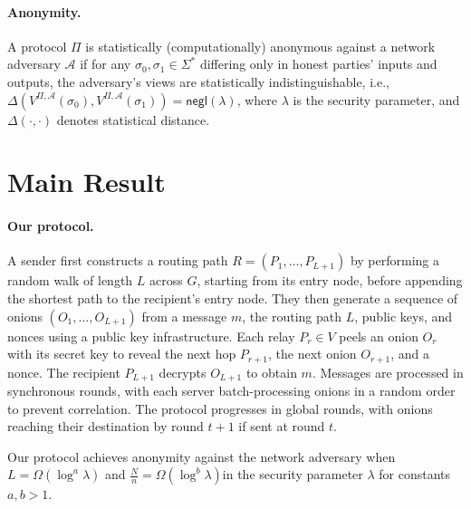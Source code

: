 \paragraph{Anonymity.} A protocol $\Pi$ is statistically (computationally) anonymous against a network adversary $\mathcal{A}$ if for any $\sigma_0, \sigma_1 \in \Sigma^*$ differing only in honest parties' inputs and outputs, the adversary’s views are statistically indistinguishable, i.e., $\Delta(V^{\Pi,\mathcal{A}}(\sigma_0), V^{\Pi,\mathcal{A}}(\sigma_1)) = \mathsf{negl}(\lambda)$, where $\lambda$ is the security parameter, and $\Delta(\cdot, \cdot)$ denotes statistical distance. 



\section{Main Result}

\paragraph{Our protocol.} A sender first constructs a routing path $R =(P_1, \dots, P_{L+1})$ by performing a random walk of length $L$ across $G$, starting from its entry node, before appending the shortest path to the recipient’s entry node. They then generate a sequence of onions $(O_1, \dots, O_{L+1})$ from a message $m$, the routing path $L$, public keys, and nonces using a public key infrastructure. Each relay $P_r \in V$ peels an onion $O_r$ with its secret key to reveal the next hop $P_{r+1}$, the next onion $O_{r+1}$, and a nonce. The recipient $P_{L+1}$ decrypts $O_{L+1}$ to obtain $m$. Messages are processed in synchronous rounds, with each server batch-processing onions in a random order to prevent correlation. The protocol progresses in global rounds, with onions reaching their destination by round $t+1$ if sent at round $t$.

\begin{theorem} \label{clm:network}
Our protocol achieves anonymity against the network adversary when $L = \Omega(\log^a \lambda)$ and $\frac{N}{n} = \Omega(\log^b \lambda)$in the security parameter $\lambda$  for constants $a, b > 1$.
\end{theorem}

